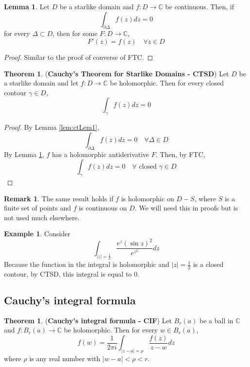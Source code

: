 \documentclass[12pt,a4paper]{article}
\theoremstyle{definition}
\newtheorem{theorem}[definition]{Theorem}
\newtheorem{lemma}[definition]{Lemma}
\newtheorem{example}[definition]{Example}
\newtheorem*{remark}{Remark}
\begin{document}
\begin{lemma}\label{lem:ctLem2}
	Let $D$ be a starlike domain and $f: D \rightarrow \mathbb{C}$ be continuous. Then, if
	\[
		\int_{\partial \Delta} f(z) dz = 0
	\]
	for every $\Delta \subset D$, then for some $F: D \rightarrow \mathbb{C}$,
	\[
		F'(z) = f(z) \quad \forall z \in D
	\]
\end{lemma}

\begin{proof}
	Similar to the proof of converse of FTC.
\end{proof}

\begin{theorem}
	(\textbf{Cauchy's Theorem for Starlike Domains - CTSD}) Let $D$ be a starlike domain and let $f: D \rightarrow \mathbb{C}$ be holomorphic. Then for every closed contour $\gamma \in D$,
	\[
		\int_{\gamma} f(z) dz = 0
	\]
\end{theorem}

\begin{proof}
	By Lemma \ref{lem:ctLem1},
	\[
		\int_{\partial \Delta} f(z) dz = 0 \quad \forall \Delta \in D
	\]
	By Lemma \ref{lem:ctLem2}, $f$ has a holomorphic antiderivative $F$. Then, by FTC,
	\[
		\int_{\gamma} f(z) dz = 0 \quad \forall \text{ closed } \gamma \in D
	\]
\end{proof}

\begin{remark}
	The same result holds if $f$ is holomorphic on $D - S$, where $S$ is a finite set of points and $f$ is continuous on $D$. We will need this in proofs but is not used much elsewhere.
\end{remark}

\begin{example}
	Consider
	\[
		\int_{|z| = \frac{1}{2}} \frac{e^z {(\sin z)}^2}{e^{z^2}} dz
	\]
	Because the function in the integral is holomorphic and $|z| = \frac{1}{2}$ is a closed contour, by CTSD, this integral is equal to $0$.
\end{example}

\subsection{Cauchy's integral formula}

\begin{theorem}
	(\textbf{Cauchy's integral formula - CIF}) Let $B_r(a)$ be a ball in $\mathbb{C}$ and $f: B_r(a) \rightarrow \mathbb{C}$ be holomorphic. Then for every $w \in B_r(a)$,
	\[
		f(w) = \frac{1}{2 \pi i} \int_{|z - a| = \rho} \frac{f(z)}{z - w} dz
	\]
	where $\rho$ is any real number with $|w - a| < \rho < r$.
\end{theorem}
\end{document}
